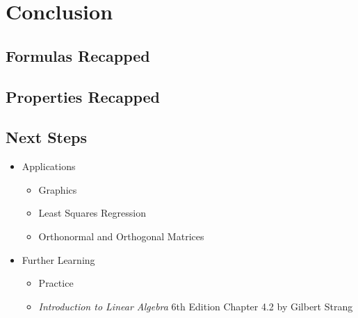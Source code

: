 \documentclass[12pt]{beamer}
\begin{document}
\section{Conclusion}

\subsection{Formulas Recapped}

\subsection{Properties Recapped}

\subsection{Next Steps}

\begin{frame}
    \begin{itemize}
        \item Applications
              \begin{itemize}
                  \item Graphics
                  \item Least Squares Regression
                  \item Orthonormal and Orthogonal Matrices
              \end{itemize}
        \item Further Learning
              \begin{itemize}
                  \item Practice
                  \item \textit{Introduction to Linear Algebra} 6th Edition Chapter 4.2 by Gilbert Strang
              \end{itemize}
    \end{itemize}
\end{frame}
\end{document}
